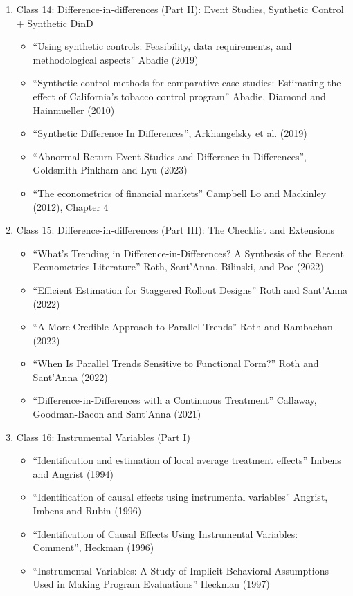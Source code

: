 \documentclass[11pt, a4paper]{article}
\begin{document}
\begin{enumerate}
\begin{enumerate}
  \item Class 14: Difference-in-differences (Part II): Event Studies, Synthetic Control + Synthetic DinD
    \begin{itemize}
    \item ``Using synthetic controls: Feasibility, data requirements, and methodological aspects'' Abadie (2019)
    \item ``Synthetic control methods for comparative case studies: Estimating the effect of California’s tobacco control program'' Abadie, Diamond and Hainmueller (2010)
    \item ``Synthetic Difference In Differences'', Arkhangelsky et al. (2019)
    \item ``Abnormal Return Event Studies and Difference-in-Differences'', Goldsmith-Pinkham and Lyu (2023)
    \item ``The econometrics of financial markets'' Campbell Lo and Mackinley (2012), Chapter 4
    \end{itemize}
  \item Class 15: Difference-in-differences (Part III): The Checklist and Extensions
    \begin{itemize}
    \item ``What’s Trending in Difference-in-Differences? A Synthesis of the Recent Econometrics Literature'' Roth, Sant’Anna,  Bilinski, and Poe (2022)
    \item ``Efficient Estimation for Staggered Rollout Designs'' Roth and Sant'Anna (2022)
    \item ``A More Credible Approach to Parallel Trends'' Roth and Rambachan (2022)
    \item ``When Is Parallel Trends Sensitive to Functional Form?'' Roth and Sant'Anna (2022)
    \item ``Difference-in-Differences with a Continuous Treatment'' Callaway, Goodman-Bacon and Sant'Anna (2021)
    \end{itemize}
  \item Class 16: Instrumental Variables (Part I)
    \begin{itemize}
    \item ``Identification and estimation of local average treatment effects'' Imbens and Angrist (1994)
    \item ``Identification of causal effects using instrumental variables'' Angrist, Imbens and Rubin (1996)
    \item ``Identification of Causal Effects Using Instrumental Variables: Comment'', Heckman (1996)
    \item ``Instrumental Variables: A Study of Implicit Behavioral Assumptions Used in Making Program Evaluations'' Heckman (1997)

\end{itemize}
\end{enumerate}
\end{enumerate}
\end{document}
